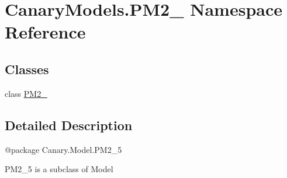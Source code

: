 \hypertarget{namespace_canary_models_1_1_p_m2__5}{\section{Canary\-Models.\-P\-M2\-\_ Namespace Reference}
\label{namespace_canary_models_1_1_p_m2__5}
}
\subsection*{Classes}
\begin{DoxyCompactItemize}
\item 
class \hyperlink{class_canary_models_1_1_p_m2__5_1_1_p_m2__5}{P\-M2\-\_}
\end{DoxyCompactItemize}


\subsection{Detailed Description}
\begin{DoxyVerb}@package Canary.Model.PM2_5

PM2_5 is a subclass of Model
\end{DoxyVerb}
 